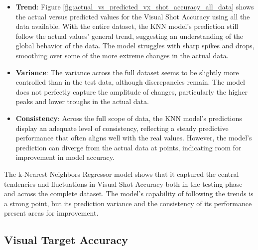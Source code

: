 \begin{itemize}
    \item \textbf{Trend}: Figure \ref{fig:actual_vs_predicted_vx_shot_accuracy_all_data} shows the actual versus predicted values for the Visual Shot Accuracy using all the data available.  
    With the entire dataset, the KNN model's prediction still follow the actual values' general trend, suggesting an understanding of the global behavior of the data. The model struggles
    with sharp spikes and drops, smoothing over some of the more extreme changes in the actual data. 
    
    \item \textbf{Variance}: The variance across the full dataset seems to be slightly more controlled than in the test data, although discrepancies remain. The model does not perfectly capture
    the amplitude of changes, particularly the higher peaks and lower troughs in the actual data.
    
    \item \textbf{Consistency}: Across the full scope of data, the KNN model's predictions display an adequate level of consistency, reflecting a steady predictive performance that often aligns well with the real values.
    However, the model's prediction can diverge from the actual data at points, indicating room for improvement in model accuracy.
    
\end{itemize}

The k-Nearest Neighbors Regressor model shows that it captured the central tendencies and fluctuations in Visual Shot Accuracy both in the testing phase and across the complete dataset. The model's capability of 
following the trends is a strong point, but its prediction variance and the consistency of its performance present areas for improvement. 


\subsection*{Visual Target Accuracy}

